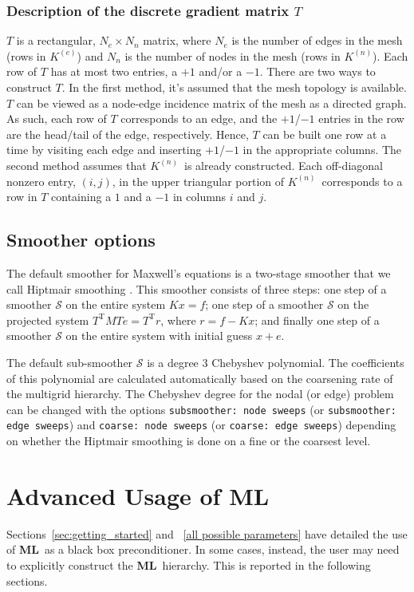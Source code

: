 \documentclass{article}[11pt]
\newcommand{\ML}     {{\bf ML}}
\newcommand \Ke {\ensuremath{K^{(e)}}}
\newcommand \Kn {\ensuremath{K^{(n)}}}
\begin{document}
\subsubsection{Description of the discrete gradient matrix $T$}\label{T matrix}
%
$T$ is a rectangular, $N_e\times N_n$ matrix, where $N_e$ is the number of
edges in the mesh (rows in \Ke) and $N_n$ is the number of nodes in the mesh
(rows in \Kn).
Each row of $T$ has at most two entries, a $+1$ and/or a $-1$.
There are two ways to construct $T$.
In the first method, 
it's assumed that the mesh topology is available.
$T$ can be viewed as a node-edge incidence matrix of the mesh as a
directed graph.
As such,
each row of $T$ corresponds to an edge, and the $+1$/$-1$ entries in the
row are the head/tail of the edge, respectively.
Hence, $T$ can be built one row at a time by visiting each edge and inserting
$+1$/$-1$ in the appropriate columns.
The second method assumes that \Kn\ is already constructed.
Each off-diagonal nonzero entry, $(i,j)$, in the upper triangular
portion of \Kn\ corresponds to a row in $T$ containing
a $1$ and a $-1$ in columns $i$ and $j$.
\subsection{Smoother options}\label{maxwell smoothers}
%
The default smoother for Maxwell's equations is a two-stage smoother that we
call Hiptmair smoothing \cite{Hiptmair_1998a}.
This smoother consists of three steps: one step of a smoother $\mathcal S$ on
the entire system $Kx=f$; one step of a smoother $\mathcal S$ on the
projected system $T^{\mathrm{T}}MTe=T^{\mathrm{T}}r$, where $r = f - Kx$;
and finally one step of a smoother $\mathcal S$ on the entire system with
initial guess $x+e$.

The default sub-smoother $\mathcal S$ is a degree 3 Chebyshev
polynomial.
The coefficients of this polynomial are calculated automatically based on the
coarsening rate of the multigrid hierarchy.
The Chebyshev degree for the nodal (or edge) problem can be changed with the 
options \verb!subsmoother: node sweeps!  (or \verb!subsmoother: edge sweeps!)
and \verb!coarse: node sweeps! (or \verb!coarse: edge sweeps!) depending on
whether the Hiptmair smoothing is done on a fine or the coarsest level.


\clearpage
\newpage

\section{Advanced Usage of \ML} \label{high level sample}
%
Sections~\ref{sec:getting_started} and ~\ref{all possible parameters} have detailed the
use of \ML~as a black box preconditioner. In some cases, instead, the
user may need to explicitly construct the \ML\ hierarchy. This is
reported in the following sections.
\end{document}
